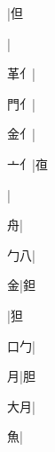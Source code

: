 \begin{multicols}{2}
{{}|{\cjk{}但}\par
{}|{}\par
{\cjk{}{\cnsym{}　}革{亻}}|{}\par
{\cjk{}{\cnsym{}　}門{亻}}|{}\par
{\cjk{}{\cnsym{}　}金{亻}}|{}\par
{\cjk{}{\cnsym{}　}亠{亻}}|{\cjk{}亱}\par
{}|{}\par
{\cjk{}{\cnsym{}　}{\cnsym{}　}舟}|{}\par
{\cjk{}{\cnsym{}　}勹八}|{}\par
{\cjk{}{\cnsym{}　}{\cnsym{}　}金}|{\cjk{}鉭}\par
{}|{\cjk{}狚}\par
{\cjk{}{\cnsym{}　}口勹}|{}\par
{\cjk{}{\cnsym{}　}{\cnsym{}　}月}|{\cjk{}胆}\par
{大月}|{}\par
{\cjk{}{\cnsym{}　}{\cnsym{}　}魚}|{}\par
}
\end{multicols}
